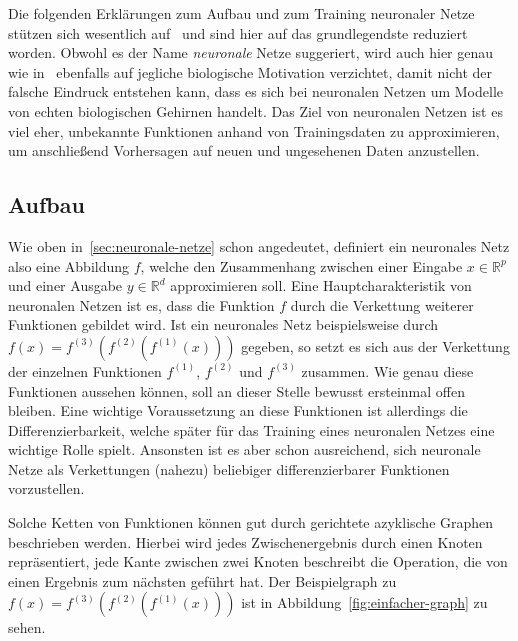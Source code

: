 Die folgenden Erkl\"arungen zum Aufbau und zum Training neuronaler Netze
st\"utzen sich wesentlich auf~\cite{Goodfellow-et-al-2016} und sind hier
auf das grundlegendste reduziert worden.
Obwohl es der Name \textit{neuronale} Netze suggeriert, wird auch hier
genau wie in~\cite{Goodfellow-et-al-2016} ebenfalls auf jegliche
biologische Motivation verzichtet, damit nicht der falsche Eindruck
entstehen kann, dass es sich bei neuronalen Netzen um Modelle von echten
biologischen Gehirnen handelt.
Das Ziel von neuronalen Netzen ist es viel eher, unbekannte Funktionen
anhand von Trainingsdaten zu approximieren, um anschlie{\ss}end Vorhersagen
auf neuen und ungesehenen Daten anzustellen.

\subsection{Aufbau}
\label{sec:aufbau}

Wie oben in~\ref{sec:neuronale-netze} schon angedeutet, definiert ein neuronales Netz
also eine Abbildung $f$, welche den Zusammenhang zwischen einer Eingabe $x \in \mathbb{R}^p$
und einer Ausgabe $y \in \mathbb{R}^d$ approximieren soll.
Eine Hauptcharakteristik von neuronalen Netzen ist es, dass die Funktion $f$
durch die Verkettung weiterer Funktionen gebildet wird.
Ist ein neuronales Netz beispielsweise durch
$f(x) = f^{(3)}(f^{(2)}(f^{(1)}(x)))$ gegeben, so setzt es sich aus der
Verkettung der einzelnen Funktionen $f^{(1)}$, $f^{(2)}$ und
$f^{(3)}$ zusammen. Wie genau diese Funktionen aussehen k\"onnen, soll an dieser
Stelle bewusst ersteinmal offen bleiben.
Eine wichtige Voraussetzung an diese Funktionen ist allerdings die
Differenzierbarkeit, welche sp\"ater f\"ur das Training eines neuronalen
Netzes eine wichtige Rolle spielt.
Ansonsten ist es aber schon ausreichend, sich neuronale Netze als
Verkettungen (nahezu) beliebiger differenzierbarer Funktionen vorzustellen.

Solche Ketten von Funktionen k\"onnen gut durch gerichtete
azyklische Graphen beschrieben werden. Hierbei wird jedes Zwischenergebnis
durch einen Knoten repr\"asentiert, jede Kante zwischen zwei Knoten beschreibt
die Operation, die von einen Ergebnis zum n\"achsten gef\"uhrt hat.
Der Beispielgraph zu $f(x) = f^{(3)}(f^{(2)}(f^{(1)}(x)))$ ist in
Abbildung~\ref{fig:einfacher-graph} zu sehen.

